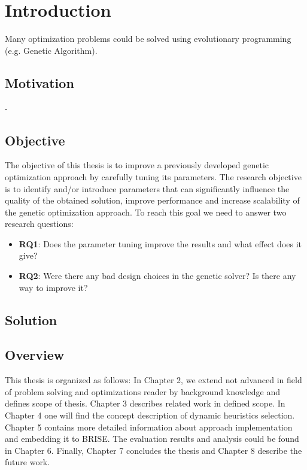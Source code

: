 \chapter{Introduction}\label{intro}

Many optimization problems could be solved using evolutionary programming (e.g. Genetic Algorithm). 

\section{Motivation}
- 


\section{Objective}
The objective of this thesis is to improve a previously developed genetic optimization approach by carefully tuning its parameters. The research objective is to identify and/or introduce parameters that can significantly influence the quality of the obtained solution, improve performance and increase scalability of the genetic optimization approach. To reach this goal we need to answer two research questions:
\begin{itemize}
	\item \textbf{RQ1}: Does the parameter tuning improve the results and what effect does it give?
	\item \textbf{RQ2}: Were there any bad design choices in the genetic solver? Is there any way to improve it?
\end{itemize}

\section{Solution}


  	
\section{Overview}
This thesis is organized as follows: In Chapter 2, we extend not advanced in field of problem solving and optimizations reader by background knowledge and defines scope of thesis. Chapter 3 describes related work in defined scope. In Chapter 4 one will find the concept description of dynamic heuristics selection. Chapter 5 contains more detailed information about approach implementation and  embedding it to BRISE. The evaluation results and analysis could be found in Chapter 6. Finally, Chapter 7 concludes the thesis and Chapter 8 describe the future work.
